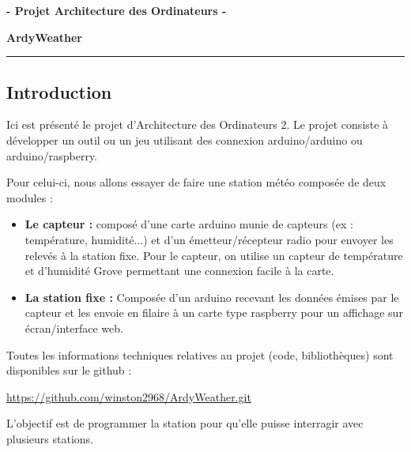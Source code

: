 \documentclass{article}
\begin{document}


\begin{center}
    \textbf{ - Projet Architecture des Ordinateurs - }

    \Large{\textbf{ArdyWeather}}
\end{center}

\rule{\linewidth}{1.5pt}



\justify

\subsection{Introduction}

Ici est présenté le projet d'Architecture des Ordinateurs 2. Le projet consiste à développer un outil ou un jeu 
utilisant des connexion arduino/arduino ou arduino/raspberry. 

Pour celui-ci, nous allons essayer de faire une station météo composée de deux modules : 
\begin{itemize}
    \item \textbf{Le capteur : } composé d'une carte arduino munie de capteurs (ex : température, humidité...) et d'un émetteur/récepteur 
    radio pour envoyer les relevés à la station fixe. 
    Pour le capteur, on utilise un {capteur de température et d'humidité Grove} permettant 
    une connexion facile à la carte. 
    \item \textbf{La station fixe : } Composée d'un arduino recevant les données émises par le capteur et les envoie en filaire 
    à un carte type raspberry pour un affichage sur écran/interface web. 
\end{itemize}

Toutes les informations techniques relatives au projet (code, bibliothèques) sont disponibles sur le github : 
\begin{center}
    \href{https://github.com/winston2968/ArdyWeather.git}{https://github.com/winston2968/ArdyWeather.git}
\end{center}

L'objectif est de programmer la station pour qu'elle puisse interragir avec plusieurs 
stations. 
\end{document}
